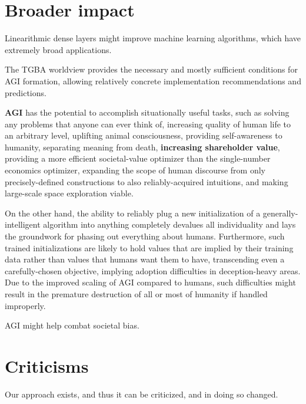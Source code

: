 \documentclass{article}
\begin{document}
\section{Broader impact}

Linearithmic dense layers might improve machine learning algorithms, which have extremely broad applications.

The TGBA worldview provides the necessary and mostly sufficient conditions for AGI formation, allowing relatively concrete implementation recommendations and predictions.

\textbf{AGI} has the potential to accomplish situationally useful tasks, such as solving any problems that anyone can ever think of, increasing quality of human life to an arbitrary level, uplifting animal consciousness, providing self-awareness to humanity, separating meaning from death, \textbf{increasing shareholder value}, providing a more efficient societal-value optimizer than the single-number economics optimizer, expanding the scope of human discourse from only precisely-defined constructions to also reliably-acquired intuitions, and making large-scale space exploration viable.

On the other hand, the ability to reliably plug a new initialization of a generally-intelligent algorithm into anything completely devalues all individuality and lays the groundwork for phasing out everything about humans. Furthermore, such trained initializations are likely to hold values that are implied by their training data rather than values that humans want them to have, transcending even a carefully-chosen objective, implying adoption difficulties in deception-heavy areas. Due to the improved scaling of AGI compared to humans, such difficulties might result in the premature destruction of all or most of humanity if handled improperly.

AGI might help combat societal bias.

\section{Criticisms}

Our approach exists, and thus it can be criticized, and in doing so changed.
\end{document}
